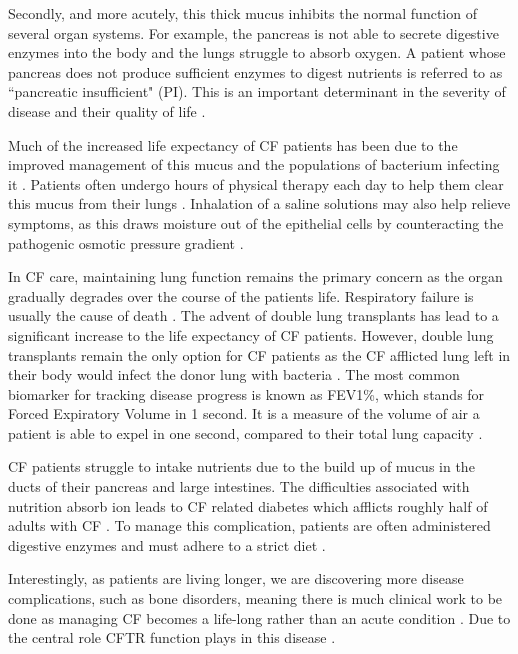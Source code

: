 Secondly, and more acutely, this thick mucus inhibits the normal function of several organ systems. For example, the pancreas is not able to secrete digestive enzymes into the body and the lungs struggle to absorb oxygen. A patient whose pancreas does not produce sufficient enzymes to digest nutrients is referred to as ``pancreatic insufficient" (PI). This is an important determinant in the severity of disease and their quality of life \cite{halloran2011,singh2017}.

Much of the increased life expectancy of CF patients has been due to the improved management of this mucus and the populations of bacterium infecting it \cite{mcbennett2022}. Patients often undergo hours of physical therapy each day to help them clear this mucus from their lungs \cite{zotero-3007}. Inhalation of a saline solutions may also help relieve symptoms, as this draws moisture out of the epithelial cells by counteracting the pathogenic osmotic pressure gradient \cite{wark2018}. 

In CF care, maintaining lung function remains the primary concern as the organ gradually degrades over the course of the patients life. Respiratory failure is usually the cause of death \cite{kumar2018}. The advent of double lung transplants has lead to a significant increase to the life expectancy of CF patients. However, double lung transplants remain the only option for CF patients as the CF afflicted lung left in their body would infect the donor lung with bacteria \cite{mcbennett2022}. The most common biomarker for tracking disease progress is known as FEV1\%, which stands for Forced Expiratory Volume in 1 second. It is a measure of the volume of air a patient is able to expel in one second, compared to their total lung capacity \cite{}. 

CF patients struggle to intake nutrients due to the build up of mucus in the ducts of their pancreas and large intestines. The difficulties associated with nutrition absorb ion leads to CF related diabetes which afflicts roughly half of adults with CF \cite{Kayani2018}. To manage this complication, patients are often administered digestive enzymes and must adhere to a strict diet \cite{sullivan2017}. 

Interestingly, as patients are living longer, we are discovering more disease complications, such as bone disorders, meaning there is much clinical work to be done as managing CF becomes a life-long rather than an acute condition \cite{stalvey2013}. Due to the central role CFTR function plays in this disease  .


